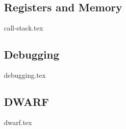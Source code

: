  

\subsection{Registers and Memory}
\label{sec:regmem}
{call-stack.tex}


\subsection{Debugging}
{debugging.tex}


\subsection{DWARF}
\label{sec:dwarf}
{dwarf.tex}

